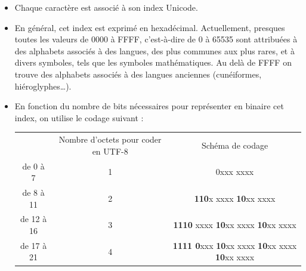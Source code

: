 \begin{itemize}
    \item Chaque caractère est associé à son index Unicode.
    \item 	En général, cet index est exprimé en hexadécimal.
          Actuellement, presques toutes les valeurs de 0000 à FFFF, c'est-à-dire de 0 à 65535 sont
          attribuées à des \og alphabets \fg{} associés à des langues, des plus communes aux plus rares, et à divers symboles, tels que les
          symboles mathématiques.
          Au delà de FFFF on trouve des alphabets associés à des langues anciennes (cunéiformes, hiéroglyphes\ldots).
    \item  En fonction du nombre de bits nécessaires pour représenter en binaire  cet index, on utilise le codage suivant :\\

          \begin{center}
              {\scriptsize
                  \begin{tabular}{CCC}

                       & {\boxfont\color{white}Nombre d'octets pour coder en UTF-8} & {\boxfont\color{white}Schéma de codage}                                     \\

                      de 0 à 7                                                              & 1                                                          & 0xxx xxxx                                                                   \\

                      de 8 à 11                                                             & 2                                                          & \textbf{110}x xxxx \textbf{10}xx xxxx                                       \\

                      de 12 à 16                                                            & 3                                                          & \textbf{1110} xxxx \textbf{10}xx xxxx \textbf{10}xx xxxx                    \\

                      de 17 à 21                                                            & 4                                                          & \textbf{1111 0}xxx \textbf{10}xx xxxx \textbf{10}xx xxxx \textbf{10}xx xxxx \\
                  \end{tabular} }
              \normalsize
          \end{center}
          \vspace{1em}
\end{itemize}
